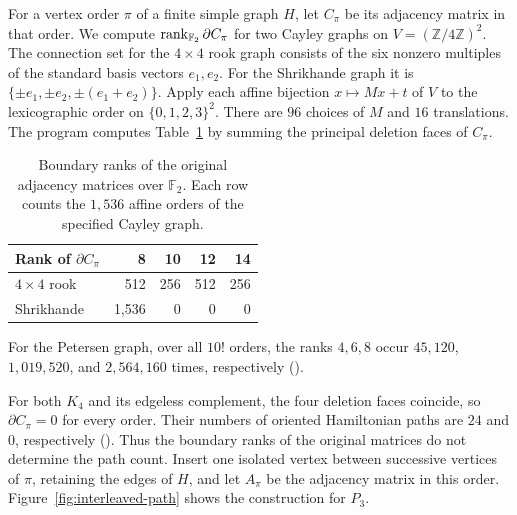 For a vertex order $\pi$ of a finite simple graph $H$, let $C_\pi$ be its
adjacency matrix in that order. We compute $\operatorname{rank}_{\mathbb F_2}\partial C_\pi$
for two Cayley graphs on $V=(\mathbb Z/4\mathbb Z)^2$. The connection
set for the $4\times4$ rook graph consists of the six nonzero multiples of
the standard basis vectors $e_1,e_2$. For the Shrikhande graph it is
$\{\pm e_1,\pm e_2,\pm(e_1+e_2)\}$. Apply each affine bijection
$x\mapsto Mx+t$ of $V$ to the lexicographic order on $\{0,1,2,3\}^2$.
There are $96$ choices of $M$ and $16$ translations.
The program 
computes Table~\ref{tab:affine-ranks} by summing the principal deletion faces of $C_\pi$.

\begin{table}[htb]
\centering\small
\caption{Boundary ranks of the original adjacency matrices over $\mathbb F_2$.
Each row counts the $1{,}536$ affine orders of the specified Cayley graph.}
\label{tab:affine-ranks}
\begin{tabular}{l|rrrr}
Rank of $\partial C_\pi$ & 8 & 10 & 12 & 14 \\ \hline
$4\times4$ rook & 512 & 256 & 512 & 256 \\
Shrikhande & 1,536 & 0 & 0 & 0
\end{tabular}
\end{table}

For the Petersen graph, over all $10!$ orders, the ranks $4,6,8$ occur
$45{,}120$, $1{,}019{,}520$, and $2{,}564{,}160$ times, respectively
().

For both $K_4$ and its edgeless complement, the four deletion faces coincide,
so $\partial C_\pi=0$ for every order. Their numbers of oriented Hamiltonian
paths are $24$ and $0$, respectively
().
Thus the boundary ranks of the original matrices do not determine the path count.
Insert one isolated vertex between successive vertices of $\pi$, retaining
the edges of $H$, and let $A_\pi$ be the adjacency matrix in this order.
Figure~\ref{fig:interleaved-path} shows the construction for $P_3$.

